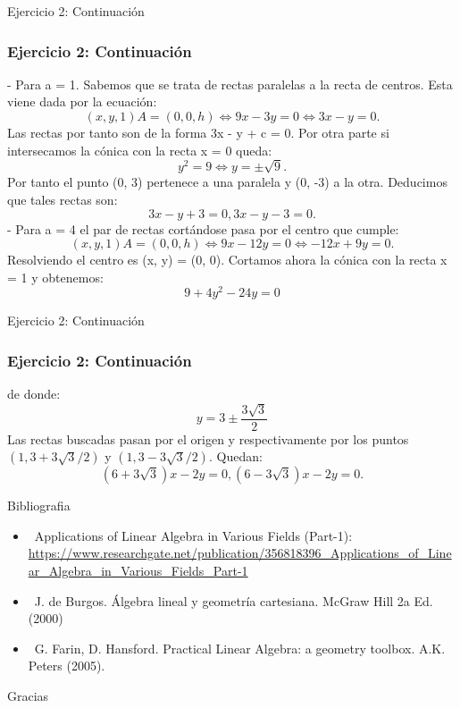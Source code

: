 \documentclass[xcolor={dvipsnames},aspectratio=169,10pt]{beamer}
\begin{document}
\begin{frame}{Ejercicio 2: Continuación}
  \frametitle{Ejercicio 2: Continuación}
  - Para a = 1. Sabemos que se trata de rectas paralelas a la recta de centros. Esta viene dada por la ecuación:
  \[(x, y, 1)A = (0, 0, h) \Leftrightarrow 9x - 3y = 0 \Leftrightarrow 3x - y = 0.\]
  Las rectas por tanto son de la forma 3x - y + c = 0. Por otra parte si intersecamos la cónica con la recta x = 0 queda:
  \[y^2 = 9 \Leftrightarrow y = \pm\sqrt{9}.\]
  Por tanto el punto (0, 3) pertenece a una paralela y (0, -3) a la otra. Deducimos que tales rectas son:
  \[3x - y + 3 = 0, 3x - y - 3 = 0.\]
  - Para a = 4 el par de rectas cortándose pasa por el centro que cumple:
  \[(x, y, 1)A = (0, 0, h) \Leftrightarrow 9x - 12y = 0 \Leftrightarrow -12x + 9y = 0.\]
  Resolviendo el centro es (x, y) = (0, 0). Cortamos ahora la cónica con la recta x = 1 y obtenemos:
  \[9 + 4y^2 - 24y = 0\]
\end{frame}

\begin{frame}{Ejercicio 2: Continuación}
  \frametitle{Ejercicio 2: Continuación}
  de donde:
  \[y = 3 \pm \frac{3\sqrt{3}}{2}\]
  Las rectas buscadas pasan por el origen y respectivamente por los puntos $(1, 3+3\sqrt{3}/2)$ y $(1, 3-3\sqrt{3}/2)$.
  Quedan:
  \[(6 + 3\sqrt{3})x - 2y = 0, (6 - 3\sqrt{3})x - 2y = 0.\]
\end{frame}

\begin{frame}{Bibliografia}
  \begin{itemize}
    \item \faGlobe\, Applications of Linear Algebra in Various Fields (Part-1): \url{https://www.researchgate.net/publication/356818396_Applications_of_Linear_Algebra_in_Various_Fields_Part-1}
    \item \faBook\, J. de Burgos. Álgebra lineal y geometría cartesiana. McGraw Hill 2a Ed. (2000)
    \item \faBook\, G. Farin, D. Hansford. Practical Linear Algebra: a geometry toolbox. A.K. Peters (2005).
  \end{itemize}
\end{frame}

\begin{frame}[standout]
  Gracias \\
\end{frame}
\end{document}
